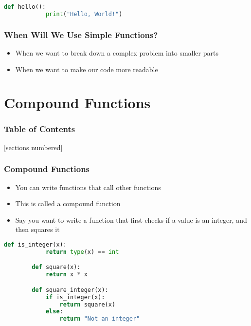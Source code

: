 \documentclass[serif, 9pt, aspectratio=32]{beamer}
\begin{document}
\begin{frame}[fragile]
    \begin{lstlisting}[language=Python]
        def hello():
            print("Hello, World!")
    \end{lstlisting}
\end{frame}

\begin{frame}
    \centering
    \frametitle{When Will We Use Simple Functions?}
    \begin{itemize}
        \setlength{\itemsep}{3em}
        \item When we want to break down a complex problem into smaller parts
        \item When we want to make our code more readable
    \end{itemize}
\end{frame}

\section{Compound Functions}

\begin{frame}
    \frametitle{Table of Contents}
    [sections numbered]
    \tableofcontents[currentsection]
\end{frame}

\begin{frame}
    \centering
    \frametitle{Compound Functions}
    \begin{itemize}
        \setlength{\itemsep}{3em}
        \item You can write functions that call other functions
        \item This is called a compound function
        \item Say you want to write a function that first checks if a value is an integer, and then squares it
    \end{itemize}
\end{frame}

\begin{frame}[fragile]
    \begin{lstlisting}[language=Python]
        def is_integer(x):
            return type(x) == int

        def square(x):
            return x * x

        def square_integer(x):
            if is_integer(x):
                return square(x)
            else:
                return "Not an integer"
    \end{lstlisting}
\end{frame}
\end{document}
